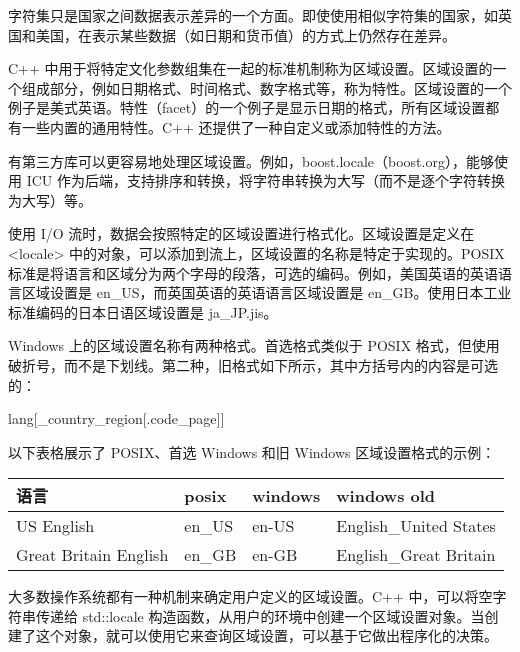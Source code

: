 
字符集只是国家之间数据表示差异的一个方面。即使使用相似字符集的国家，如英国和美国，在表示某些数据（如日期和货币值）的方式上仍然存在差异。

C++ 中用于将特定文化参数组集在一起的标准机制称为区域设置。区域设置的一个组成部分，例如日期格式、时间格式、数字格式等，称为特性。区域设置的一个例子是美式英语。特性（facet）的一个例子是显示日期的格式，所有区域设置都有一些内置的通用特性。C++ 还提供了一种自定义或添加特性的方法。

有第三方库可以更容易地处理区域设置。例如，boost.locale（boost.org），能够使用 ICU 作为后端，支持排序和转换，将字符串转换为大写（而不是逐个字符转换为大写）等。


使用 I/O 流时，数据会按照特定的区域设置进行格式化。区域设置是定义在 <locale> 中的对象，可以添加到流上，区域设置的名称是特定于实现的。POSIX 标准是将语言和区域分为两个字母的段落，可选的编码。例如，美国英语的英语语言区域设置是 en\_US，而英国英语的英语语言区域设置是 en\_GB。使用日本工业标准编码的日本日语区域设置是 ja\_JP.jis。

Windows 上的区域设置名称有两种格式。首选格式类似于 POSIX 格式，但使用破折号，而不是下划线。第二种，旧格式如下所示，其中方括号内的内容是可选的：

\begin{cpp}
lang[_country_region[.code_page]]
\end{cpp}

以下表格展示了 POSIX、首选 Windows 和旧 Windows 区域设置格式的示例：

\begin{longtable}{|l|l|l|l|}
\hline
\textbf{语言}     & \textbf{posix} & \textbf{windows} & \textbf{windows old}   \\ \hline
\endfirsthead
%
\endhead
%
US English            & en\_US         & en-US            & English\_United States \\ \hline
Great Britain English & en\_GB         & en-GB            & English\_Great Britain \\ \hline
\end{longtable}

大多数操作系统都有一种机制来确定用户定义的区域设置。C++ 中，可以将空字符串传递给 std::locale 构造函数，从用户的环境中创建一个区域设置对象。当创建了这个对象，就可以使用它来查询区域设置，可以基于它做出程序化的决策。


